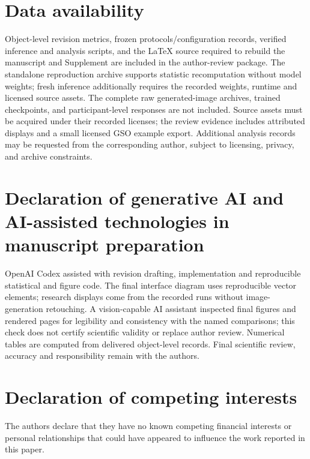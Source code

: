 \documentclass[times,twocolumn,final]{elsarticle}
\begin{document}
\section*{Data availability}

Object-level revision metrics, frozen protocols/configuration records, verified inference and analysis scripts, and the LaTeX source required to rebuild the manuscript and Supplement are included in the author-review package. The standalone reproduction archive supports statistic recomputation without model weights; fresh inference additionally requires the recorded weights, runtime and licensed source assets. The complete raw generated-image archives, trained checkpoints, and participant-level responses are not included. Source assets must be acquired under their recorded licenses; the review evidence includes attributed displays and a small licensed GSO example export. Additional analysis records may be requested from the corresponding author, subject to licensing, privacy, and archive constraints.

\section*{Declaration of generative AI and AI-assisted technologies in manuscript preparation}
OpenAI Codex assisted with revision drafting, implementation and reproducible statistical and figure code. The final interface diagram uses reproducible vector elements; research displays come from the recorded runs without image-generation retouching. A vision-capable AI assistant inspected final figures and rendered pages for legibility and consistency with the named comparisons; this check does not certify scientific validity or replace author review. Numerical tables are computed from delivered object-level records. Final scientific review, accuracy and responsibility remain with the authors.

\section*{Declaration of competing interests}

The authors declare that they have no known competing financial interests or personal relationships that could have appeared to influence the work reported in this paper.
\end{document}
